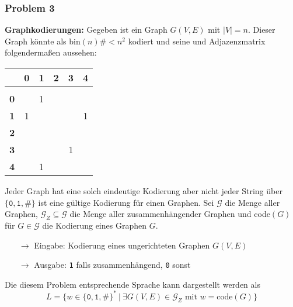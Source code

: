 \documentclass{scrartcl}%
\begin{document}
    \subsubsection*{Problem 3}
    \textbf{\textsf{Graphkodierungen:}} Gegeben ist ein Graph $G(V,E)$ mit $|V| = n$.
    Dieser Graph könnte als bin$(n)\#<n^2$ kodiert und seine und Adjazenzmatrix folgendermaßen aussehen:
    \begin{table}[H]
        \centering
        \small
        \begin{tabular}{r|ccccc}
            & \textbf{\textsf{0}} & \textbf{\textsf{1}} & \textbf{\textsf{2}} & \textbf{\textsf{3}} & \textbf{\textsf{4}} \\
            \hline \\ [-2ex]
            \textbf{\textsf{0}} & & 1 & & &  \\
            \textbf{\textsf{1}} & 1 & & & & 1 \\
            \textbf{\textsf{2}} & & & & &  \\
            \textbf{\textsf{3}} & & & & 1 &  \\
            \textbf{\textsf{4}} & & 1 & & &
        \end{tabular}
    \end{table}

    Jeder Graph hat eine solch eindeutige Kodierung aber nicht jeder String über $\{\texttt{0},\texttt{1},\#\}$ ist eine gültige Kodierung für einen Graphen.
    Sei $\mathcal{G}$ die Menge aller Graphen, $\mathcal{G}_Z \subseteq \mathcal{G}$ die Menge aller zusammenhängender Graphen und code$(G)$ für $G \in \mathcal{G}$ die Kodierung eines Graphen $G$.

    \begin{itemize}
        \item [$\rightarrow$] Eingabe: Kodierung eines ungerichteten Graphen $G(V,E)$
        \item [$\rightarrow$] Ausgabe: \texttt{1} falls zusammenhängend, \texttt{0} sonst
    \end{itemize}

    Die diesem Problem entsprechende Sprache kann dargestellt werden als
    \begin{equation*}
        L = \{ w \in \{\texttt{0}, \texttt{1},\#\}^* \ |\ \exists G(V,E) \in \mathcal{G}_Z \text{ mit } w=\text{code}(G) \}
    \end{equation*}
\end{document}
